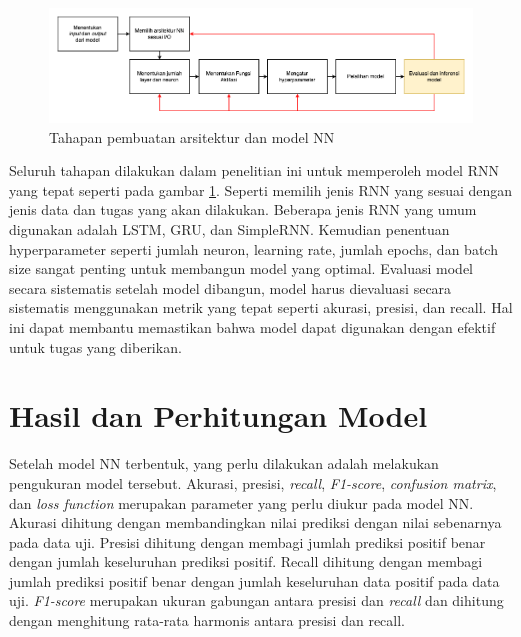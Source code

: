 \begin{figure}[H]
	\vspace{-0.1cm}
	\begin{center}
		\includegraphics[width=1\columnwidth]{bab3/Gambar/langkah-model.png}
	\end{center}
	\vspace{-0.2cm}
	\caption{Tahapan pembuatan arsitektur dan model NN}
	\label{langkah-model}
\end{figure}

Seluruh tahapan dilakukan dalam penelitian ini untuk memperoleh model RNN yang tepat seperti pada gambar \ref{langkah-model}. Seperti memilih jenis RNN yang sesuai dengan jenis data dan tugas yang akan dilakukan. Beberapa jenis RNN yang umum digunakan adalah LSTM, GRU, dan SimpleRNN. Kemudian penentuan hyperparameter seperti jumlah neuron, learning rate, jumlah epochs, dan batch size sangat penting untuk membangun model yang optimal. Evaluasi model secara sistematis setelah model dibangun, model harus dievaluasi secara sistematis menggunakan metrik yang tepat seperti akurasi, presisi, dan recall. Hal ini dapat membantu memastikan bahwa model dapat digunakan dengan efektif untuk tugas yang diberikan.


\section{Hasil dan Perhitungan Model}
\hspace{1.2cm}
Setelah model NN terbentuk, yang perlu dilakukan adalah melakukan pengukuran model tersebut. Akurasi, presisi, \textit{recall}, \textit{F1-score}, \textit{confusion matrix}, dan \textit{loss function} merupakan parameter yang perlu diukur pada model NN. Akurasi dihitung dengan membandingkan nilai prediksi dengan nilai sebenarnya pada data uji. Presisi dihitung dengan membagi jumlah prediksi positif benar dengan jumlah keseluruhan prediksi positif. Recall dihitung dengan membagi jumlah prediksi positif benar dengan jumlah keseluruhan data positif pada data uji. \textit{F1-score} merupakan ukuran gabungan antara presisi dan \textit{recall} dan dihitung dengan menghitung rata-rata harmonis antara presisi dan recall.

